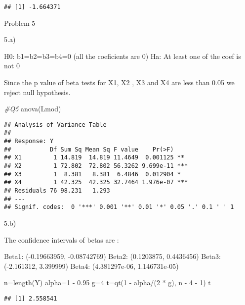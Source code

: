 \documentclass[
]{article}
\newenvironment{Shaded}{\begin{snugshade}}{\end{snugshade}}
\newcommand{\CommentTok}[1]{\textcolor[rgb]{0.56,0.35,0.01}{\textit{#1}}}
\newcommand{\DecValTok}[1]{\textcolor[rgb]{0.00,0.00,0.81}{#1}}
\newcommand{\FloatTok}[1]{\textcolor[rgb]{0.00,0.00,0.81}{#1}}
\newcommand{\FunctionTok}[1]{\textcolor[rgb]{0.00,0.00,0.00}{#1}}
\newcommand{\NormalTok}[1]{#1}
\newcommand{\OtherTok}[1]{\textcolor[rgb]{0.56,0.35,0.01}{#1}}
\newcommand{\SpecialCharTok}[1]{\textcolor[rgb]{0.00,0.00,0.00}{#1}}
\begin{document}
\begin{verbatim}
## [1] -1.664371
\end{verbatim}

Problem 5

5.a)

H0: b1=b2=b3=b4=0 (all the coeficients are 0) Ha: At least one of the
coef is not 0

Since the p value of beta tests for X1, X2 , X3 and X4 are less than
0.05 we reject null hypothesis.

\begin{Shaded}
\begin{Highlighting}[]
\CommentTok{\#Q5}
\FunctionTok{anova}\NormalTok{(Lmod)}
\end{Highlighting}
\end{Shaded}

\begin{verbatim}
## Analysis of Variance Table
## 
## Response: Y
##           Df Sum Sq Mean Sq F value    Pr(>F)    
## X1         1 14.819  14.819 11.4649  0.001125 ** 
## X2         1 72.802  72.802 56.3262 9.699e-11 ***
## X3         1  8.381   8.381  6.4846  0.012904 *  
## X4         1 42.325  42.325 32.7464 1.976e-07 ***
## Residuals 76 98.231   1.293                      
## ---
## Signif. codes:  0 '***' 0.001 '**' 0.01 '*' 0.05 '.' 0.1 ' ' 1
\end{verbatim}

5.b)

The confidence intervals of betas are :

Beta1: (-0.19663959, -0.08742769) Beta2: (0.1203875, 0.4436456) Beta3:
(-2.161312, 3.399999) Beta4: (4.381297e-06, 1.146731e-05)

\begin{Shaded}
\begin{Highlighting}[]
\NormalTok{n}\OtherTok{=}\FunctionTok{length}\NormalTok{(Y)}
\NormalTok{alpha}\OtherTok{=}\DecValTok{1} \SpecialCharTok{{-}} \FloatTok{0.95}
\NormalTok{g}\OtherTok{=}\DecValTok{4}
\NormalTok{t}\OtherTok{=}\FunctionTok{qt}\NormalTok{(}\DecValTok{1} \SpecialCharTok{{-}}\NormalTok{ alpha}\SpecialCharTok{/}\NormalTok{(}\DecValTok{2} \SpecialCharTok{*}\NormalTok{ g), n }\SpecialCharTok{{-}} \DecValTok{4} \SpecialCharTok{{-}} \DecValTok{1}\NormalTok{)}
\NormalTok{t}
\end{Highlighting}
\end{Shaded}

\begin{verbatim}
## [1] 2.558541
\end{verbatim}
\end{document}
